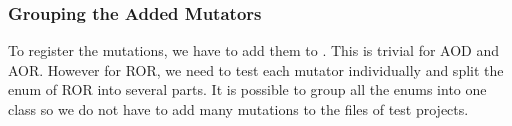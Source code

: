 \subsubsection{Grouping the Added Mutators}
To register the mutations, we have to add them to .
This is trivial for AOD and AOR.
However for ROR, we need to test each mutator individually and split the enum of ROR into several parts.
It is possible to group all the enums into one class so we do not have to add many mutations to the  files of test projects.

